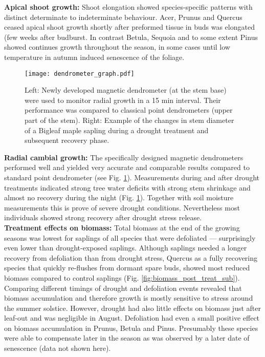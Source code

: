 \documentclass{article}
\begin{document}
	
	\textbf{Apical shoot growth:}
	Shoot elongation showed species-specific patterns with distinct determinate to indeterminate behaviour. Acer, Prunus and Quercus ceased apical shoot growth shortly after preformed tissue in buds was elongated (few weeks after budburst. In contrast Betula, Sequoia and to some extent Pinus showed continues growth throughout the season, in some cases until low temperature in autumn induced senescence of the foliage.\\
	\begin{figure}[H]
		\centering
		\texttt{[image: dendrometer\_graph.pdf]} 
		\caption{Left: Newly developed magnetic dendrometer (at the stem base) were used to monitor radial growth in a 15 min interval. Their performance was compared to classical point dendrometers (upper part of the stem). Right: Example of the changes in stem diameter of a Bigleaf maple sapling during a drought treatment and subsequent recovery phase.}
		\label{fig:dendrometer_graph}
	\end{figure}
	
	\textbf{Radial cambial growth:}
	The specifically designed magnetic dendrometers performed well and yielded very accurate and comparable results compared to standard point dendrometer (see Fig. \ref{fig:dendrometer_graph}). Measurements during and after drought treatments indicated strong tree water deficits with strong stem shrinkage and almost no recovery during the night (Fig. \ref{fig:dendrometer_graph}). Together with soil moisture measurements this is prove of severe drought conditions. Nevertheless most individuals showed strong recovery after drought stress release. 	\\
	
	
	\textbf{Treatment effects on biomass:}
	Total biomass at the end of the growing seasons was lowest for saplings of all species that were defoliated --- surprisingly even lower than drought-exposed saplings. Although saplings needed a longer recovery from defoliation than from drought stress, Quercus as a fully recovering species that quickly re-flushes from dormant spare buds, showed most reduced biomass compared to control saplings (Fig. \ref{fig:biomass_post_treat_sub}).
	Comparing different timings of drought and defoliation events revealed that biomass accumulation and therefore growth is mostly sensitive to stress around the summer solstice. However, drought had also little effects on biomass just after leaf-out and was negligible in August. Defoliation had even a small positive effect on biomass accumulation in Prunus, Betula and Pinus. Presumably these species were able to compensate later in the season as was observed by a later date of senescence (data not shown here).
	\\
	
\end{document}

